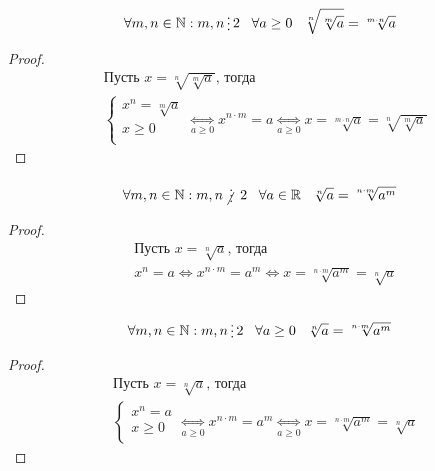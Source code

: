 \begin{theorem}
    \begin{align*}
        \forall m,n \in \mathbb{N}: m,n \divisible 2 \;\;\; \forall a \ge 0 \;\;\; \sqrt[n]{\sqrt[m]{a}} = \sqrt[m \cdot n]{a}
    \end{align*}
\end{theorem}

\begin{proof}
    \hfill
    \begin{align*}
        &\text{Пусть } x = \sqrt[n]{\sqrt[m]{a}} \text{, тогда} \\
        &\left\{\begin{array}{l}
            x^n = \sqrt[m]{a} \\
            x \ge 0 \\
        \end{array}\right. \underset{a \ge 0}{\iff}
        x^{n \cdot m} = a \underset{a \ge 0}{\iff}
        x = \sqrt[m \cdot n]{a} = \sqrt[n]{\sqrt[m]{a}}
    \end{align*}
\end{proof}

\begin{theorem}
    \begin{align*}
        \forall m,n \in \mathbb{N}: m,n \notdivisible 2 \;\;\; \forall a \in \mathbb{R} \;\;\; \sqrt[n]{a} = \sqrt[n \cdot m]{a^m}
    \end{align*}
\end{theorem}

\begin{proof}
    \hfill
    \begin{align*}
        &\text{Пусть } x = \sqrt[n]{a} \text{, тогда} \\
        & x^n = a \iff
        x^{n \cdot m} = a^m \iff
        x = \sqrt[n \cdot m]{a^m} = \sqrt[n]{a}
    \end{align*}
\end{proof}

\begin{theorem}
    \begin{align*}
        \forall m,n \in \mathbb{N}: m,n \divisible 2 \;\;\; \forall a \ge 0 \;\;\; \sqrt[n]{a} = \sqrt[n \cdot m]{a^m}
    \end{align*}
\end{theorem}

\begin{proof}
    \hfill
    \begin{align*}
        &\text{Пусть } x = \sqrt[n]{a} \text{, тогда} \\
        &\left\{\begin{array}{l}
            x^n = a \\
            x \ge 0 \\
        \end{array}\right. \underset{a \ge 0}{\iff}
        x^{n \cdot m} = a^m \underset{a \ge 0}{\iff}
        x = \sqrt[n \cdot m]{a^m} = \sqrt[n]{a}
    \end{align*}
\end{proof}

